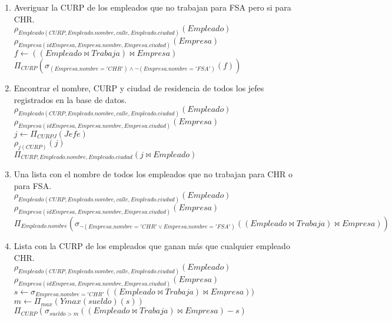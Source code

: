 \documentclass{article}
\begin{document}
\begin{enumerate}
\begin{enumerate}
				\item Averiguar la CURP de los empleados que no trabajan para FSA pero si para CHR.\\
				
				$\rho_{Empleado(CURP, Empleado.nombre, calle, Empleado.ciudad)}(Empleado)$\\
				$\rho_{Empresa(idEmpresa, Empresa.nombre, Empresa.ciudad)}(Empresa)$\\
				$f \leftarrow ((Empleado \bowtie Trabaja) \bowtie Empresa)$\\
				$\Pi_{CURP}(\sigma_{(Empresa.nombre = 'CHR') \land \lnot(Empresa.nombre = 'FSA')}(f))$\\
				
				\item Encontrar el nombre, CURP y ciudad de residencia de todos los jefes registrados en la base de
				datos.\\
				
				$\rho_{Empleado(CURP, Empleado.nombre, calle, Empleado.ciudad)}(Empleado)$\\
				$\rho_{Empresa(idEmpresa, Empresa.nombre, Empresa.ciudad)}(Empresa)$\\
				$j \leftarrow \Pi_{CURPJ}(Jefe)$\\
				$\rho_{j(CURP)}(j)$\\
				$\Pi_{CURP, Empleado.nombre, Empleado.ciudad}(j \bowtie Empleado)$\\
				
				\item Una lista con el nombre de todos los empleados que no trabajan para CHR o para FSA.\\
				
				$\rho_{Empleado(CURP, Empleado.nombre, calle, Empleado.ciudad)}(Empleado)$\\
				$\rho_{Empresa(idEmpresa, Empresa.nombre, Empresa.ciudad)}(Empresa)$\\
				$\Pi_{Empleado.nombre}(\sigma_{\lnot(Empresa.nombre = 'CHR' \lor Empresa.nombre = 'FSA')}((Empleado \bowtie Trabaja) \bowtie Empresa))$\\
				
				\item Lista con la CURP de los empleados que ganan más que cualquier empleado CHR.\\
				
				$\rho_{Empleado(CURP, Empleado.nombre, calle, Empleado.ciudad)}(Empleado)$\\
				$\rho_{Empresa(idEmpresa, Empresa.nombre, Empresa.ciudad)}(Empresa)$\\
				$s \leftarrow \sigma_{Empresa.nombre = 'CHR'}((Empleado \bowtie Trabaja) \bowtie Empresa))$\\
				$m \leftarrow \Pi_{max}(Y max(sueldo)(s))$\\
				$\Pi_{CURP}(\sigma_{sueldo > m}((Empleado \bowtie Trabaja) \bowtie Empresa) - s)$\\
				

\end{enumerate}
\end{enumerate}
\end{document}
